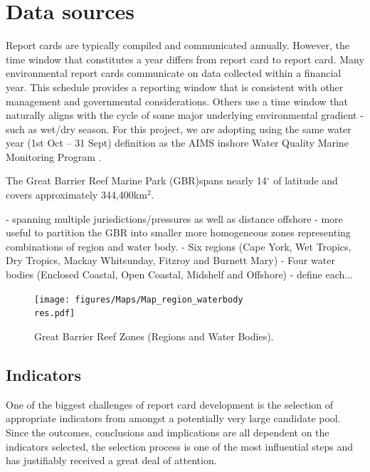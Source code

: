\section{Data sources}

Report cards are typically compiled and communicated annually.  However, the time window that
constitutes a year differs from report card to report card.  Many environmental report cards
communicate on data collected within a financial year.  This schedule provides a reporting window
that is consistent with other management and governmental considerations.  Others use a time window
that naturally aligns with the cycle of some major underlying environmental gradient - such as
wet/dry season. For this project, we are adopting using the same water year (1st Oct -- 31 Sept)
definition as the AIMS inshore Water Quality Marine Monitoring Program \citep{Lonborg-MMP-2015}.

The Great Barrier Reef Marine Park (GBR)spans nearly 14$^\circ$ of latitude and covers approximately
344,400km$^2$.

- spanning multiple jurisdictions/pressures as well as distance offshore - more useful to partition
the GBR into smaller more homogeneous zones representing combinations of region and water body.  -
Six regions (Cape York, Wet Tropics, Dry Tropics, Mackay Whitsunday, Fitzroy and Burnett Mary) -
Four water bodies (Enclosed Coastal, Open Coastal, Midshelf and Offshore) - define each...
 

  

\begin{figure}[ptbh] \texttt{[image: figures/Maps/Map\_region\_waterbody\\res.pdf]}
\caption{Great Barrier Reef Zones (Regions and Water Bodies).}\label{fig:Map_region_waterbody}
\end{figure}
   



\subsection{Indicators}

One of the biggest challenges of report card development is the selection of appropriate indicators
from amongst a potentially very large candidate pool.  Since the outcomes, conclusions and
implications are all dependent on the indicators selected, the selection process is one of the most
influential steps and has justifiably received a great deal of attention.

